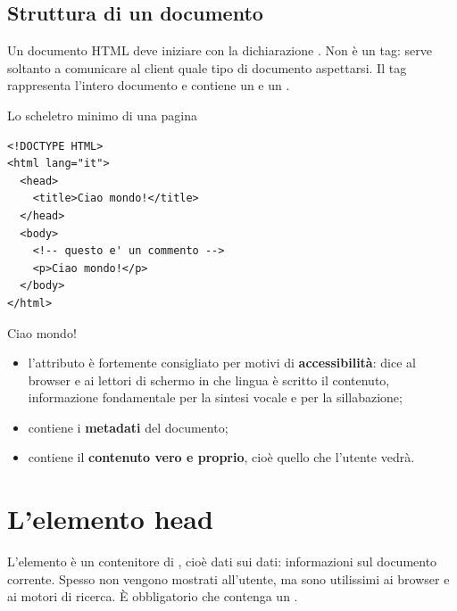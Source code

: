 \begin{center}
\end{center}

\subsection{Struttura di un documento}

Un documento HTML deve iniziare con la dichiarazione . Non
è un tag: serve soltanto a comunicare al client quale tipo di documento
aspettarsi. Il tag  rappresenta l'intero documento e contiene un
 e un .

\begin{esempio}{Lo scheletro minimo di una pagina}
\begin{affianco}[0.5]
\begin{lstlisting}[style=html, name=hello.html]
<!DOCTYPE HTML>
<html lang="it">
  <head>
    <title>Ciao mondo!</title>
  </head>
  <body>
    <!-- questo e' un commento -->
    <p>Ciao mondo!</p>
  </body>
</html>
\end{lstlisting}
\risultato
\begin{browser}
  Ciao mondo!
\end{browser}
\end{affianco}

\begin{itemize}
  \item l'attributo  è fortemente consigliato per motivi di
        \textbf{accessibilità}: dice al browser e ai lettori di schermo in che
        lingua è scritto il contenuto, informazione fondamentale per la sintesi
        vocale e per la sillabazione;
  \item {} contiene i \textbf{metadati} del documento;
  \item {} contiene il \textbf{contenuto vero e proprio}, cioè quello che
        l'utente vedrà.
\end{itemize}
\end{esempio}

\section{L'elemento head}

L'elemento  è un contenitore di , cioè \guillemotleft dati sui
dati\guillemotright: informazioni sul documento corrente. Spesso non vengono mostrati
all'utente, ma sono utilissimi ai browser e ai motori di ricerca. È obbligatorio
che contenga un .

